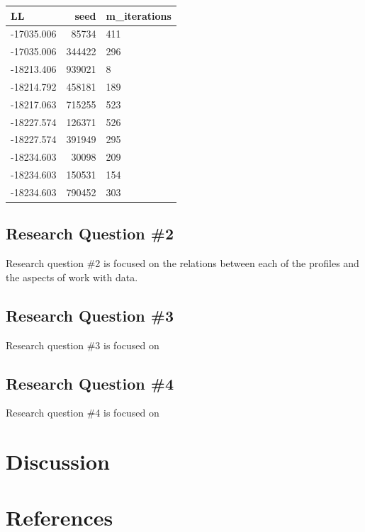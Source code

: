 \documentclass[]{msu-thesis}
\theoremstyle{definition}
\theoremstyle{definition}
\theoremstyle{definition}
\theoremstyle{remark}
\begin{document}
\begin{tabular}{l|r|l}
\hline
LL & seed & m\_iterations\\
\hline
-17035.006 & 85734 & 411\\
\hline
-17035.006 & 344422 & 296\\
\hline
-18213.406 & 939021 & 8\\
\hline
-18214.792 & 458181 & 189\\
\hline
-18217.063 & 715255 & 523\\
\hline
-18227.574 & 126371 & 526\\
\hline
-18227.574 & 391949 & 295\\
\hline
-18234.603 & 30098 & 209\\
\hline
-18234.603 & 150531 & 154\\
\hline
-18234.603 & 790452 & 303\\
\hline
\end{tabular}

\section{Research Question \#2}\label{research-question-2}

Research question \#2 is focused on the relations between each of the
profiles and the aspects of work with data.

\section{Research Question \#3}\label{research-question-3}

Research question \#3 is focused on

\section{Research Question \#4}\label{research-question-4}

Research question \#4 is focused on

\chapter{Discussion}\label{discussion}

\chapter{References}\label{references}
\end{document}
